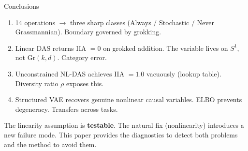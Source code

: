 \documentclass[aspectratio=169,11pt]{beamer}
\newcommand{\Gr}{\mathrm{Gr}}
\begin{document}
\begin{frame}{Conclusions}
\vspace{-0.3em}

\begin{enumerate}\setlength{\itemsep}{6pt}
  \item {\small 14 operations $\to$ three sharp classes (Always / Stochastic / Never Grassmannian). Boundary governed by grokking.}

  \item {\small Linear DAS returns IIA $= 0$ on grokked addition. The variable lives on $S^1$, not $\Gr(k,d)$. Category error.}

  \item {\small Unconstrained NL-DAS achieves IIA $= 1.0$ vacuously (lookup table). Diversity ratio $\rho$ exposes this.}

  \item {\small Structured VAE recovers genuine nonlinear causal variables. ELBO prevents degeneracy. Transfers across tasks.}
\end{enumerate}

\vspace{0.5em}
{\small The linearity assumption is \textbf{testable}. The natural fix (nonlinearity) introduces a new failure mode. This paper provides the diagnostics to detect both problems and the method to avoid them.}
\end{frame}
\end{document}
